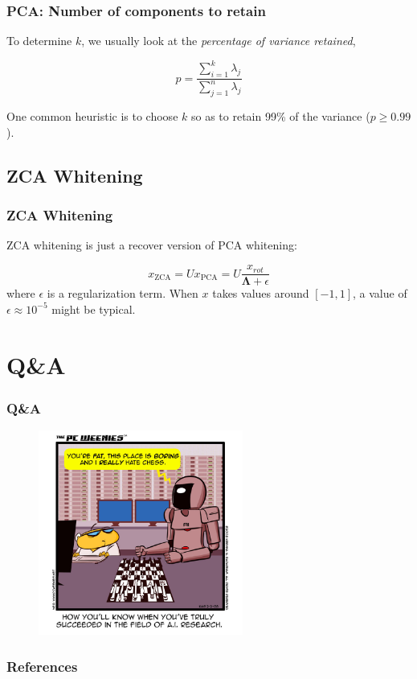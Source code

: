 \documentclass{beamer}
\begin{document}
\begin{frame}
  \frametitle{PCA: Number of components to retain}

  To determine $k$, we usually look at the \emph{percentage of variance retained},

  \begin{equation}
    p=\frac{\sum_{i=1}^{k}\lambda_{j}}{\sum_{j=1}^{n}\lambda_{j}}
  \end{equation}

  One common heuristic is to choose $k$ so as to retain 99\% of the variance ($p\geq 0.99$).
\end{frame}

\subsection{ZCA Whitening}

\begin{frame}
    \frametitle{ZCA Whitening}

    ZCA whitening is just a recover version of PCA whitening:

    \begin{equation*}
      x_{\text{ZCA}}=Ux_{\text{PCA}}=U\frac{x_{rot}}{\bm{\Lambda}+\epsilon}
    \end{equation*}
    where $\epsilon$ is a regularization term. When $x$ takes values around $[-1, 1]$, a value of $\epsilon\approx 10^{-5}$ might be typical.
\end{frame}

\section*{Q\&A}

\begin{frame}
  \frametitle{Q\&A}
  
  \begin{figure}
    \includegraphics[width=0.6\textwidth]{ai_jokes.jpg}
  \end{figure}
\end{frame}

\begin{frame}
  \frametitle{References}
  \footnotesize
  
  
\end{frame}
\end{document}
